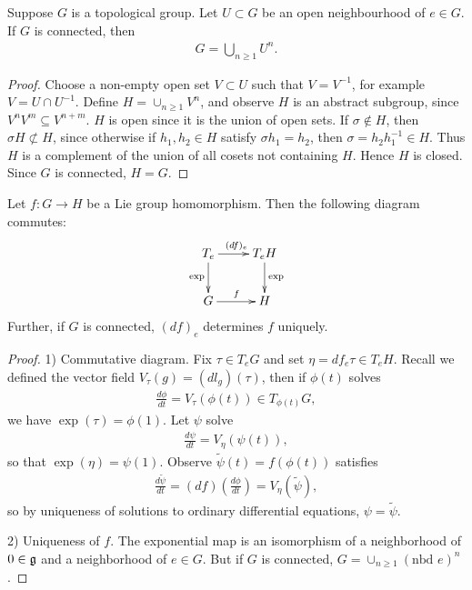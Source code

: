 \setcounter{lecture}{4}

\begin{theorem}
Suppose $G$ is a topological group.  Let $U \subset G$ be an open neighbourhood of $e
\in G$.  If $G$ is connected, then
\begin{eqnarray*}
G = \bigcup_{n \geq 1} U^n.
\end{eqnarray*}
\end{theorem}
\begin{proof}
Choose a non-empty open set $V \subset U$ such that $V = V^{-1}$, for example $V = U
\cap U^{-1}$. Define $H = \cup_{n \geq 1} V^n$, and observe $H$ is an abstract
subgroup, since $V^n V^m \subseteq V^{n+m}$.  $H$ is open since it is the union of
open sets.  If $\sigma \notin H$, then $\sigma H \not\subset H$, since otherwise if
$h_1, h_2 \in H$ satisfy $\sigma h_1 = h_2$, then $\sigma = h_2 h_1^{-1} \in H$.  Thus
$H$ is a complement of the union of all cosets not containing $H$.  Hence $H$ is
closed. Since $G$ is connected, $H = G$.
\end{proof}
\begin{theorem}
Let $f: G \to H$ be a Lie group homomorphism.  Then the following diagram commutes:
 \[\xymatrix{
 T_e \ar[r]^{(df)_e} \ar[d]_{\exp} & T_e H\ar[d]^{\exp}\\
 G \ar[r]^f & H
  }\]
Further, if $G$ is connected, $(df)_e$ determines $f$ uniquely.
\end{theorem}

\begin{proof}
1) Commutative diagram.  Fix $\tau \in T_eG$ and set $\eta = df_e \tau \in T_eH$.
Recall we defined the vector field $V_\tau(g) = (dl_g)(\tau)$, then if $\phi(t)$
solves
\begin{eqnarray*}
\frac{ d \phi}{dt} = V_\tau ( \phi(t)) \in T_{\phi(t)}G,
\end{eqnarray*}
we have $\exp(\tau) = \phi(1)$.  Let $\psi$ solve
\begin{eqnarray*}
\frac{d \psi}{dt} = V_\eta( \psi(t)),
\end{eqnarray*}
so that $\exp ( \eta) = \psi(1)$.  Observe $\tilde{\psi}(t) = f( \phi(t))$ satisfies
\begin{eqnarray*}
\frac{d \tilde{\psi}}{dt} = (df)\left( \frac{d\phi}{dt} \right) =
V_\eta(\tilde{\psi}),
\end{eqnarray*}
so by uniqueness of solutions to ordinary differential equations, $\psi =
\tilde{\psi}$.

2) Uniqueness of $f$.  The exponential map is an isomorphism of a neighborhood of $0
\in \mathfrak{g}$ and a neighborhood of $e \in G$.  But if $G$ is connected, $G = \cup_{n \geq
1} (\text{nbd } e)^n$.
\end{proof}

